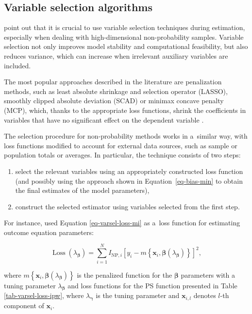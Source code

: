 \documentclass[
]{jss}
\begin{document}
\subsection{Variable selection algorithms}\label{sec-varsel}

\citet{yang_asymptotic_2020} point out that it is crucial to use
variable selection techniques during estimation, especially when dealing
with high-dimensional non-probability samples. Variable selection not
only improves model stability and computational feasibility, but also
reduces variance, which can increase when irrelevant auxiliary variables
are included.

The most popular approaches described in the literature are penalization
methods, such as least absolute shrinkage and selection operator
(LASSO), smoothly clipped absolute deviation (SCAD) or minimax concave
penalty (MCP), which, thanks to the appropriate loss functions, shrink
the coefficients in variables that have no significant effect on the
dependent variable \citep[cf.][]{tibshirani1996regression, ncvreg}.

The selection procedure for non-probability methods works in a~similar
way, with loss functions modified to account for external data sources,
such as sample or population totals or averages. In particular, the
technique consists of two steps:

\begin{enumerate}
\item select the relevant variables using an appropriately constructed loss function (and possibly using the approach shown in Equation~\ref{eq-bias-min} to obtain the final estimates of the model parameters),
\item construct the selected estimator using variables selected from the first step. 
\end{enumerate}

For instance, \citet{yang_doubly_2020} used Equation
\ref{eq-varsel-loss-mi} as a~loss function for estimating outcome
equation parameters:

\begin{equation}  
\operatorname{Loss}\left(\lambda_{\boldsymbol{\beta}}\right)=\sum_{i=1}^N I_{\text{NP},i}\left[y_i-m\left\{\boldsymbol{x}_i, \boldsymbol{\beta}(\lambda_{\boldsymbol{\beta}})\right\}\right]^2,
\label{eq-varsel-loss-mi}
\end{equation}

where
\(m\left\{\boldsymbol{x}_i, \boldsymbol{\beta}(\lambda_{\boldsymbol{\beta}})\right\}\)
is the penalized function for the \(\boldsymbol{\beta}\) parameters with
a tuning parameter \(\lambda_{\boldsymbol{\beta}}\) and loss functions
for the PS function presented in Table \ref{tab-varsel-loss-ipw}, where
\(\lambda_{\boldsymbol{\gamma}}\) is the tuning parameter and
\(\boldsymbol{x}_{i,l}\) denotes \(l\)-th component of
\(\boldsymbol{x}_{i}\).
\end{document}
